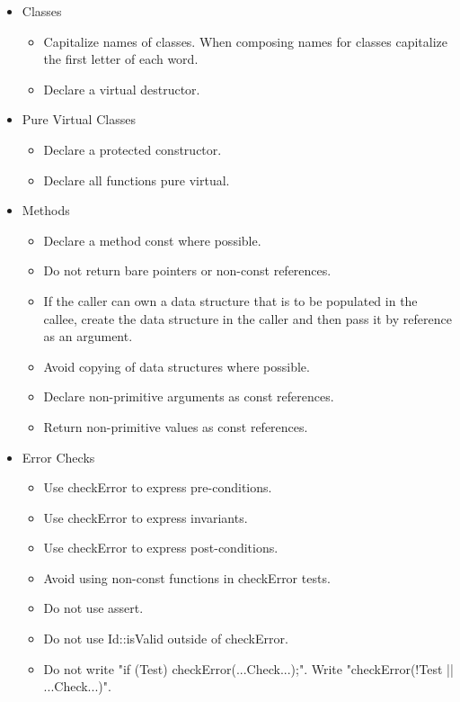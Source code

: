 \documentclass[10pt, letterpaper, twoside]{article}
\begin{document}
\begin{itemize}
\item[] Classes
 \begin{itemize}
  \item	Capitalize names of classes.  When composing names for classes capitalize the first letter of each word.
  \item	Declare a virtual destructor.
 \end{itemize}

\item[] Pure Virtual Classes
 \begin{itemize}
  \item	Declare a protected constructor.
  \item	Declare all functions pure virtual.
 \end{itemize}

\item[] Methods
 \begin{itemize}
  \item	Declare a method const where possible.
  \item	Do not return bare pointers or non-const references.
  \item	If the caller can own a data structure that is to be populated in the callee, create the data structure in the caller and then pass it by reference as an argument.
  \item	Avoid copying of data structures where possible.
  \item	Declare non-primitive arguments as const references.
  \item	Return non-primitive values as const references.
 \end{itemize}

\item[] Error Checks
 \begin{itemize}
  \item	Use checkError to express pre-conditions.
  \item	Use checkError to express invariants.
  \item	Use checkError to express post-conditions.
  \item	Avoid using non-const functions in checkError tests.
  \item	Do not use assert.
  \item	Do not use Id::isValid outside of checkError.
  \item	Do not write "if (Test) checkError(...Check...);".  Write "checkError(!Test || ...Check...)".
 \end{itemize}


\end{itemize}
\end{document}
